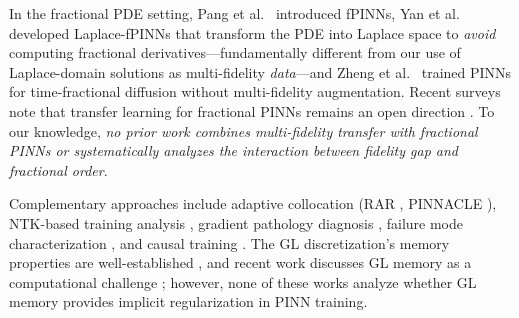 \documentclass[preprint,12pt]{elsarticle}
\begin{document}
In the fractional PDE setting, Pang et al.\ \cite{pang2019fpinns} introduced fPINNs, Yan et al.\ \cite{yan2023laplace} developed Laplace-fPINNs that transform the PDE into Laplace space to \emph{avoid} computing fractional derivatives---fundamentally different from our use of Laplace-domain solutions as multi-fidelity \emph{data}---and Zheng et al.\ \cite{zheng2021physics} trained PINNs for time-fractional diffusion without multi-fidelity augmentation. Recent surveys note that transfer learning for fractional PINNs remains an open direction \cite{zhao2025fdiff}. To our knowledge, \emph{no prior work combines multi-fidelity transfer with fractional PINNs or systematically analyzes the interaction between fidelity gap and fractional order}.

Complementary approaches include adaptive collocation (RAR \cite{wu2023comprehensive}, PINNACLE \cite{tang2025pinnacle}), NTK-based training analysis \cite{wang2022ntk}, gradient pathology diagnosis \cite{wang2021understanding}, failure mode characterization \cite{krishnapriyan2021characterizing}, and causal training \cite{wang2022respecting}. The GL discretization's memory properties are well-established \cite{podlubny1999fractional,meerschaert2004finite,li2015numerical}, and recent work discusses GL memory as a computational challenge \cite{zhao2025fdiff}; however, none of these works analyze whether GL memory provides implicit regularization in PINN training.
\end{document}
